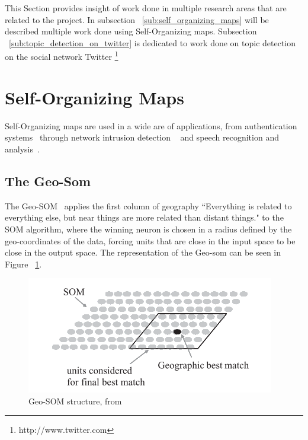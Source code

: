 
This Section provides insight of work done in multiple research areas that are related to the project. In subsection ~\ref{sub:self_organizing_maps} will be described multiple work done using Self-Organizing maps. Subsection ~\ref{sub:topic_detection_on_twitter} is dedicated to work done on topic detection on the social network Twitter \footnote{http://www.twitter.com}

\section{Self-Organizing Maps} 
\label{sec:self_organizing_maps}
Self-Organizing maps are used in a wide are of applications, from authentication systems~\cite{Dozono2012} through network intrusion detection ~\cite{intrusion_som} and speech recognition and analysis~\cite{phonetic_typewiter}.

\subsection{The Geo-Som} 
\label{sub:types_of_soms}
The Geo-SOM~\citet{Bacao2005} applies the first column of geography “Everything is related to everything else, but near things are more related than distant things." to the SOM algorithm, where the winning neuron is chosen in a radius defined by the geo-coordinates of the data, forcing units that are close in the input space to be close in the output space. The representation of the Geo-som can be seen in Figure ~\ref{fig:geo_som}.

\begin{figure}[tb]
  \begin{center}
    \includegraphics[]{images/6_geo-som.png}
  \end{center}
  \caption{Geo-SOM structure, from~\citet{Bacao2005}}
  \label{fig:geo_som}
\end{figure}


